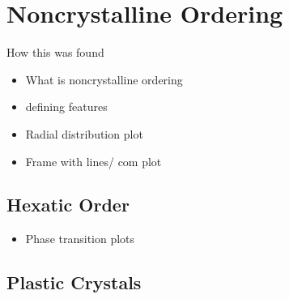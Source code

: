 \chapter{Noncrystalline Ordering}

How this was found
\begin{itemize}
    \item What is noncrystalline ordering
    \item defining features
    \item Radial distribution plot
    \item Frame with lines/ com plot
\end{itemize}

\section{Hexatic Order}

\begin{itemize}
    \item Phase transition plots
\end{itemize}

\section{Plastic Crystals}

